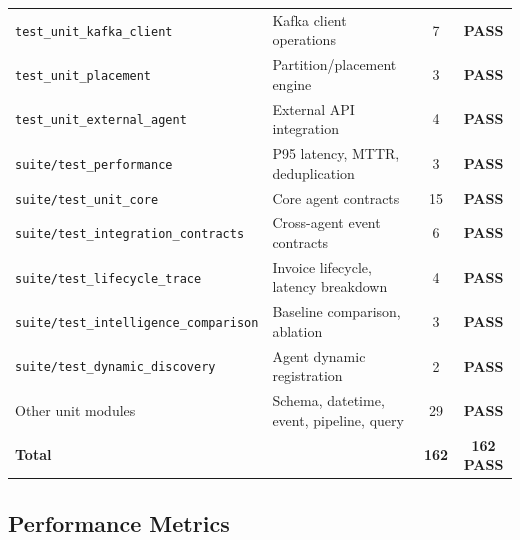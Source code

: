 \documentclass[runningheads]{llncs}
\begin{document}
\begin{table}[H]
{\begin{tabular}{llcc}
\texttt{test\_unit\_kafka\_client} & Kafka client operations & 7 & \textbf{PASS} \\
\texttt{test\_unit\_placement} & Partition/placement engine & 3 & \textbf{PASS} \\
\texttt{test\_unit\_external\_agent} & External API integration & 4 & \textbf{PASS} \\
\texttt{suite/test\_performance} & P95 latency, MTTR, deduplication & 3 & \textbf{PASS} \\
\texttt{suite/test\_unit\_core} & Core agent contracts & 15 & \textbf{PASS} \\
\texttt{suite/test\_integration\_contracts} & Cross-agent event contracts & 6 & \textbf{PASS} \\
\texttt{suite/test\_lifecycle\_trace} & Invoice lifecycle, latency breakdown & 4 & \textbf{PASS} \\
\texttt{suite/test\_intelligence\_comparison} & Baseline comparison, ablation & 3 & \textbf{PASS} \\
\texttt{suite/test\_dynamic\_discovery} & Agent dynamic registration & 2 & \textbf{PASS} \\
Other unit modules & Schema, datetime, event, pipeline, query & 29 & \textbf{PASS} \\
\midrule
\textbf{Total} & & \textbf{162} & \textbf{162 PASS} \\
\bottomrule
\end{tabular}
}
\end{table}

\subsection{Performance Metrics}
\end{document}
